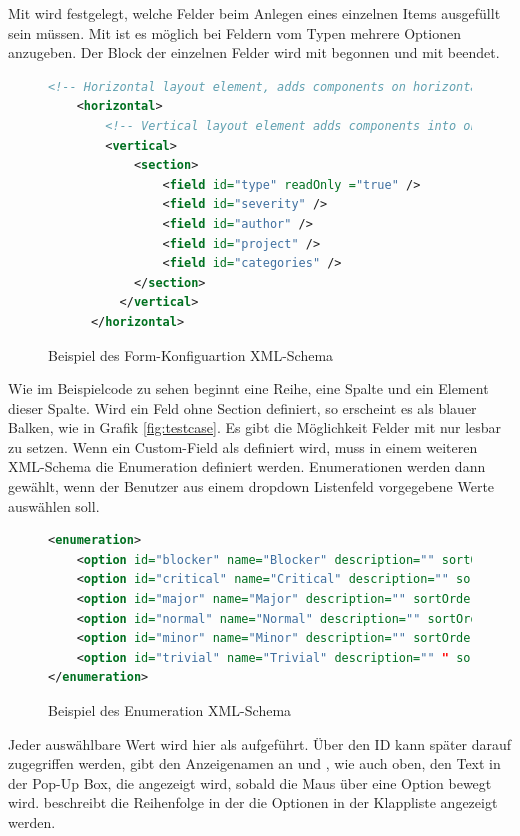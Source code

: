 Mit  wird festgelegt, welche Felder beim Anlegen eines einzelnen Items ausgefüllt sein müssen. Mit  ist es möglich bei Feldern vom Typen  mehrere Optionen anzugeben.
Der Block der einzelnen Felder wird mit  begonnen und mit  beendet.
\newpage
\begin{figure}[H]
\begin{lstlisting}[language=XML]
<!-- Horizontal layout element, adds components on horizontal row. Each component is in a new column. -->
    <horizontal>
        <!-- Vertical layout element adds components into one vertical column. Each component is in a new row. -->
        <vertical>
            <section>
                <field id="type" readOnly ="true" />
                <field id="severity" />
                <field id="author" />
                <field id="project" />
                <field id="categories" />
            </section>
 		  </vertical>
 	  </horizontal>
\end{lstlisting}
\caption{Beispiel des Form-Konfiguartion XML-Schema}
\label{fig:form}
\end{figure} 
Wie im Beispielcode zu sehen beginnt  eine Reihe,  eine Spalte und  ein Element dieser Spalte. Wird ein Feld ohne Section definiert, so erscheint es als blauer Balken, wie  in Grafik \ref{fig:testcase}. 
Es gibt die Möglichkeit Felder mit  nur lesbar zu setzen.
Wenn ein Custom-Field als  definiert wird, muss in einem weiteren XML-Schema die Enumeration definiert werden. Enumerationen werden dann gewählt, wenn der Benutzer aus einem dropdown Listenfeld vorgegebene Werte auswählen soll. \\
\begin{figure}[H]
\begin{lstlisting}[language=XML]
<enumeration>
	<option id="blocker" name="Blocker" description="" sortOrder="1"/>
	<option id="critical" name="Critical" description="" sortOrder="2"/>
	<option id="major" name="Major" description="" sortOrder="3"/>
	<option id="normal" name="Normal" description="" sortOrder="4" default="true"/>
	<option id="minor" name="Minor" description="" sortOrder="5"/>
	<option id="trivial" name="Trivial" description="" " sortOrder="6"/>
</enumeration>
\end{lstlisting}
\caption{Beispiel des Enumeration XML-Schema }
\label{fig:enum}
\end{figure} 
Jeder auswählbare Wert wird hier als  aufgeführt. Über den ID kann später darauf zugegriffen werden,  gibt den Anzeigenamen an und , wie auch oben, den Text in der Pop-Up Box, die angezeigt wird, sobald die Maus über eine Option bewegt wird.
 beschreibt die Reihenfolge in der die Optionen in der Klappliste angezeigt werden.
\\

